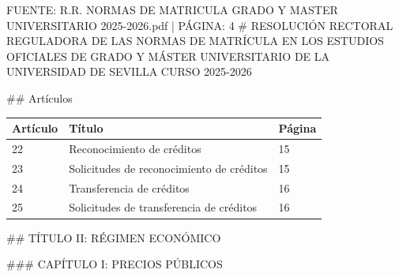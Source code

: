 \documentclass{article}
\begin{document}
\begin{itemize}
\begin{itemize}
\begin{scriptsize}
                  FUENTE: R.R. NORMAS DE MATRICULA GRADO Y MASTER UNIVERSITARIO 2025-2026.pdf | PÁGINA: 4
                  \# RESOLUCIÓN RECTORAL REGULADORA DE LAS NORMAS DE MATRÍCULA EN LOS ESTUDIOS OFICIALES DE GRADO Y MÁSTER UNIVERSITARIO DE LA UNIVERSIDAD DE SEVILLA CURSO 2025-2026

                  \#\# Artículos

                  \vspace{0.4cm}
                  \begin{table}[h!]\centering\renewcommand{\arraystretch}{1.3}
                    \begin{tabular}{|p{}|p{}|p{}|}\hline
                      Artículo & Título                                    & Página \\\hline
                      22       & Reconocimiento de créditos                & 15     \\\hline
                      23       & Solicitudes de reconocimiento de créditos & 15     \\\hline
                      24       & Transferencia de créditos                 & 16     \\\hline
                      25       & Solicitudes de transferencia de créditos  & 16     \\\hline
                    \end{tabular}\end{table}
                  \vspace{0.4cm}

                  \#\# TÍTULO II: RÉGIMEN ECONÓMICO

                  \#\#\# CAPÍTULO I: PRECIOS PÚBLICOS


\end{scriptsize}
\end{itemize}
\end{itemize}
\end{document}
